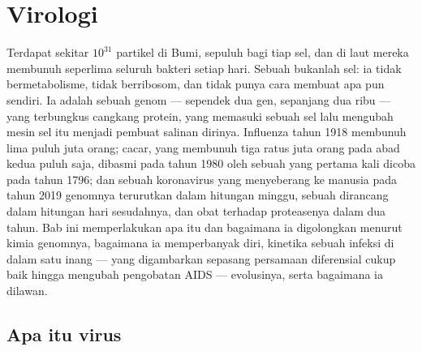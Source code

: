 \chapter{Virologi}\label{ch:b3:virology}

Terdapat sekitar $10^{31}$ partikel  di Bumi, sepuluh bagi tiap sel,
dan di laut mereka membunuh seperlima seluruh bakteri setiap hari. Sebuah 
bukanlah sel: ia tidak bermetabolisme, tidak berribosom, dan tidak punya cara
membuat apa pun sendiri. Ia adalah sebuah genom --- sependek dua gen, sepanjang
dua ribu --- yang terbungkus cangkang protein, yang memasuki sebuah sel lalu
mengubah mesin sel itu menjadi pembuat salinan dirinya. Influenza tahun 1918
membunuh lima puluh juta orang; cacar, yang membunuh tiga ratus juta orang pada
abad kedua puluh saja, dibasmi pada tahun 1980 oleh sebuah  yang pertama
kali dicoba pada tahun 1796; dan sebuah koronavirus yang menyeberang ke manusia
pada tahun 2019 genomnya terurutkan dalam hitungan minggu, sebuah 
dirancang dalam hitungan hari sesudahnya, dan obat terhadap proteasenya dalam
dua tahun. Bab ini memperlakukan apa itu  dan bagaimana ia digolongkan
menurut kimia genomnya, bagaimana ia memperbanyak diri, kinetika sebuah infeksi
di dalam satu inang --- yang digambarkan sepasang persamaan diferensial cukup
baik hingga mengubah pengobatan AIDS --- evolusinya, serta bagaimana ia dilawan.

\section{Apa itu virus}

